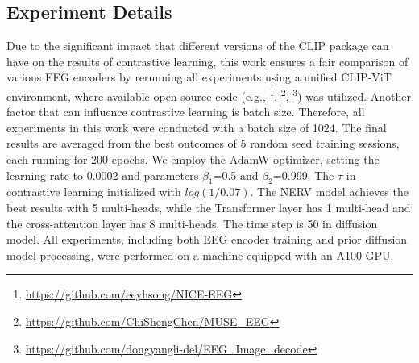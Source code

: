 \documentclass{article}
\begin{document}
\subsection{Experiment Details}
Due to the significant impact that different versions of the CLIP package can have on the results of contrastive learning, this work ensures a fair comparison of various EEG encoders by rerunning all experiments using a unified CLIP-ViT environment, where available open-source code (e.g., \cite{nice_2023}\footnote{\url{https://github.com/eeyhsong/NICE-EEG}}, \cite{muse_2024}\footnote{\url{https://github.com/ChiShengChen/MUSE_EEG}}, \cite{atm_2024}\footnote{\url{https://github.com/dongyangli-del/EEG_Image_decode}}) was utilized. Another factor that can influence contrastive learning is batch size. Therefore, all experiments in this work were conducted with a batch size of 1024. The final results are averaged from the best outcomes of 5 random seed training sessions, each running for 200 epochs. We employ the AdamW optimizer, setting the learning rate to 0.0002 and parameters \(\beta_1\)=0.5 and \(\beta_2\)=0.999. The \(\tau\) in contrastive learning initialized with $log(1/0.07)$. The NERV model achieves the best results with 5 multi-heads, while the Transformer layer has 1 multi-head and the cross-attention layer has 8 multi-heads. The time step is 50 in diffusion model.  All experiments, including both EEG encoder training and prior diffusion model processing, were performed on a machine equipped with an A100 GPU. 
\end{document}
